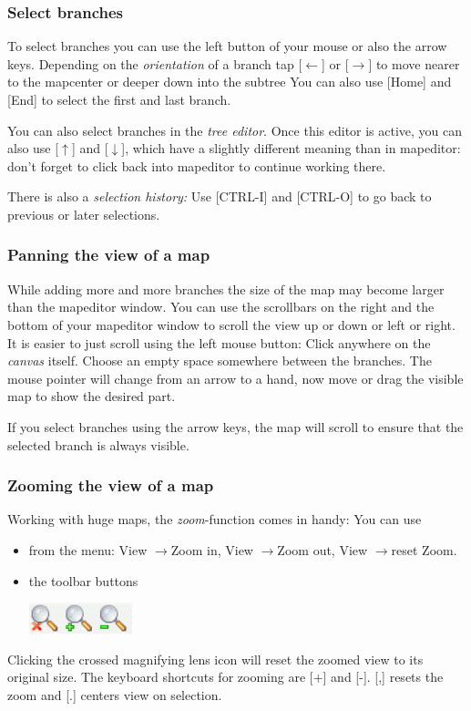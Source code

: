\documentclass[12pt,a4paper]{article}
\newcommand{\ra}{$\longrightarrow$}
\newcommand{\la}{$\longleftarrow$}
\newcommand{\ua}{$\uparrow$}
\newcommand{\da}{$\downarrow$}
\newcommand{\key}[1]{[#1]}
\begin{document}
\subsubsection*{Select branches}
To select branches you can use the left button of your mouse or also the
arrow keys. Depending on the {\em orientation} of a branch tap \key{\la}
or \key{\ra} to move nearer to the mapcenter or deeper down into the
subtree  You can also use \key{Home} and \key{End} to select the first
and last branch.

You can also select branches in the {\em tree editor}. Once this editor
is active, you can also use \key{\ua} and \key {\da}, which have a
slightly different meaning than in mapeditor: don't forget to click back
into mapeditor to continue working there.

There is also a {\em selection history:} Use \key{CTRL-I} and
\key{CTRL-O} to go back to previous or later selections.

\subsubsection*{Panning the view of a map}
While adding more and more branches the size of the map may become
larger than the mapeditor window. You can use the scrollbars on the
right and the bottom of your mapeditor window to scroll the view up or
down or left or right. It is easier to just scroll using the left mouse
button: Click anywhere on the {\em canvas} itself. Choose an empty space
somewhere between the branches. The mouse pointer will change from an
arrow to a hand, now move or drag the visible map to show the desired
part.

If you select branches using the arrow keys, the map will scroll to
ensure that the selected branch is always visible.

\subsubsection*{Zooming the view of a map}
Working with huge maps, the {\em zoom}-function comes in handy: You can
use 
\begin{itemize}
    \item from the menu: View \ra Zoom in, View \ra Zoom out, View \ra reset Zoom.
    \item the toolbar buttons 
        \begin{center}
            \includegraphics[width=3cm]{images/zoom-buttons.png}
        \end{center}    
\end{itemize}   
Clicking the crossed magnifying lens icon will reset the zoomed view to
its original size.  The keyboard shortcuts for zooming are \key{+} and
\key{-}. \key{,} resets the zoom and \key{.} centers view on selection.
\end{document}
